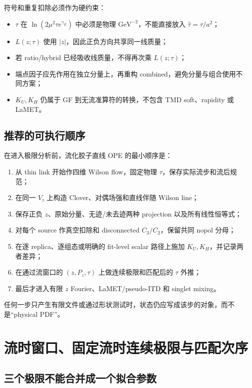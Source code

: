符号和重复扣除必须作为硬约束：
\begin{itemize}
  \item \(\tau\) 在 \(\ln(2\mu^2\tau e^{\gamma_E})\) 中必须是物理
        \(\mathrm{GeV}^{-2}\)，不能直接放入 \(\widehat\tau=\tau/a^2\)；
  \item \(L(z;\tau)\) 使用 \(|z|\)，因此正负方向共享同一线质量；
  \item 若 ratio/hybrid 已经吸收线质量，不得再次乘 \(L(z;\tau)\)；
  \item 端点因子应先作用在独立分量上，再重构 combined，避免分量与组合使用不同方案；
  \item \(K_U,K_H\) 仍属于 GF 到无流准算符的转换，不包含 TMD soft、rapidity 或 LaMET。
\end{itemize}

\section{推荐的可执行顺序}

在进入极限分析前，流化胶子直线 OPE 的最小顺序是：
\begin{enumerate}
  \item 从 thin link 开始作四维 Wilson flow，固定物理 \(\tau\)，保存实际流步和流后规范；
  \item 在同一 \(V_\tau\) 上构造 Clover、对偶场强和直线伴随 Wilson line；
  \item 保存正负 \(z\)、原始分量、无迹/未去迹两种 projection 以及所有线性恒等式；
  \item 对每个 source 作真空扣除和 disconnected \(C_3/C_2\)，保留共同 nopol 分母；
  \item 在逐 replica、逐组态或明确的 fit-level scalar 路径上施加 \(K_U,K_H\)，并记录两者差异；
  \item 在通过流窗口的 \((z,P_z,\tau)\) 上做连续极限和匹配后的 \(\tau\) 外推；
  \item 最后才进入有限 \(z\) Fourier、LaMET/pseudo-ITD 和 singlet mixing。
\end{enumerate}
任何一步只产生有限文件或通过形状测试时，状态仍应写成该步的对象，而不是“physical PDF”。

\chapter{流时窗口、固定流时连续极限与匹配次序}
\label{sec:b06-flow-window}

\section{三个极限不能合并成一个拟合参数}

